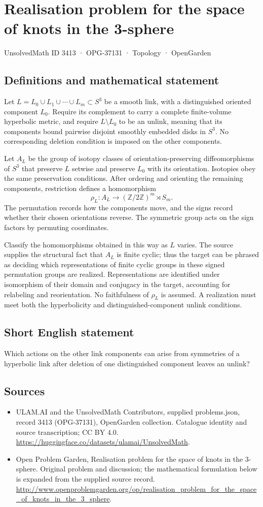 \documentclass[11pt,a4paper]{article}
\begin{document}
\section*{Realisation problem for the space of knots in the 3-sphere}\label{3413}
{\small UnsolvedMath ID 3413 · OPG-37131 · Topology · OpenGarden}
\subsection{Definitions and mathematical statement}
Let $L=L_0\cup L_1\cup\cdots\cup L_m\subset S^3$ be a smooth link,
with a distinguished oriented component $L_0$. Require its complement
to carry a complete finite-volume hyperbolic metric, and require
$L\setminus L_0$ to be an unlink, meaning that its components bound
pairwise disjoint smoothly embedded disks in $S^3$. No corresponding
deletion condition is imposed on the other components.

Let $A_L$ be the group of isotopy classes of orientation-preserving
diffeomorphisms of $S^3$ that preserve $L$ setwise and preserve $L_0$
with its orientation. Isotopies obey the same preservation conditions.
After ordering and orienting the remaining components, restriction
defines a homomorphism
\[
 \rho_L:A_L\longrightarrow (\mathbb Z/2\mathbb Z)^m\rtimes S_m.
\]
The permutation records how the components move, and the signs record
whether their chosen orientations reverse. The symmetric group acts
on the sign factors by permuting coordinates.

Classify the homomorphisms obtained in this way as $L$ varies.
The source supplies the structural fact that $A_L$ is finite cyclic;
thus the target can be phrased as deciding which representations of
finite cyclic groups in these signed permutation groups are realized.
Representations are identified under isomorphism of their domain and
conjugacy in the target, accounting for relabeling and reorientation.
No faithfulness of $\rho_L$ is assumed. A realization must meet both
the hyperbolicity and distinguished-component unlink conditions.
\subsection{Short English statement}
Which actions on the other link components can arise from symmetries of a hyperbolic link after deletion of one distinguished component leaves an unlink?
\subsection{Sources}
\begin{itemize}
\item[S1] ULAM.AI and the UnsolvedMath Contributors, supplied problems.json, record 3413 (OPG-37131), OpenGarden collection. Catalogue identity and source transcription; CC BY 4.0.
\url{https://huggingface.co/datasets/ulamai/UnsolvedMath}.
\item[S2] Open Problem Garden, Realisation problem for the space of knots in the 3-sphere. Original problem and discussion; the mathematical formulation below is expanded from the supplied source record.
\url{http://www.openproblemgarden.org/op/realisation_problem_for_the_space_of_knots_in_the_3_sphere}.
\end{itemize}
\end{document}

